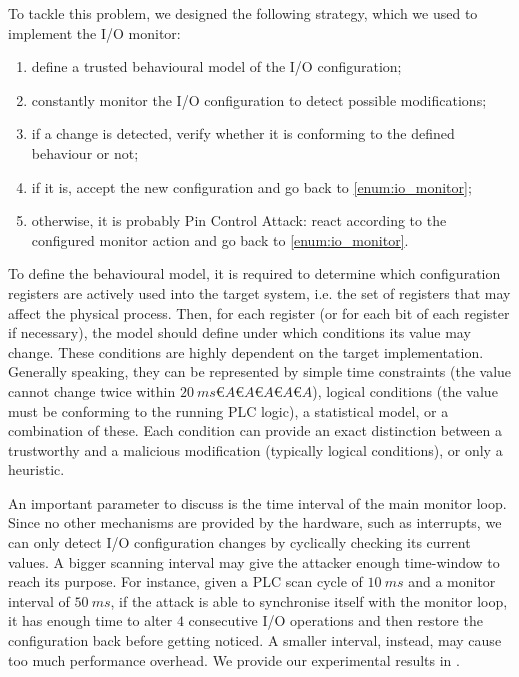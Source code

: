 To tackle this problem, we designed the following strategy, which we used to implement the I/O monitor:
\begin{enumerate}
	\item define a trusted behavioural model of the I/O configuration;
	\item \label{enum:io_monitor} constantly monitor the I/O configuration to detect possible modifications;
	\item if a change is detected, verify whether it is conforming to the defined behaviour or not;
	\item if it is, accept the new configuration and go back to \ref{enum:io_monitor};
	\item otherwise, it is probably Pin Control Attack: react according to the configured monitor action and go back to \ref{enum:io_monitor}.
\end{enumerate}
To define the behavioural model, it is required to determine which configuration registers are actively used into the target system,
i.e. the set of registers that may affect the physical process. Then, for each register (or for each bit of each register if necessary),
the model should define under which conditions its value may change. These conditions are highly dependent on the target implementation.
Generally speaking, they can be represented by simple time constraints (\eg the value cannot change twice within $\SI{20}{ms}AAAAA$),
logical conditions (\eg the value must be conforming to the running PLC logic), a statistical model, or a combination of these.
Each condition can provide an exact distinction between a trustworthy and a malicious modification (typically logical conditions),
or only a heuristic.

An important parameter to discuss is the time interval of the main monitor loop. Since no other mechanisms are provided by the hardware,
such as interrupts, we can only detect I/O configuration changes by cyclically checking its current values. A bigger scanning interval may give the attacker
enough time-window to reach its purpose. For instance, given a PLC scan cycle of $\SI{10}{ms}$ and a monitor interval of $\SI{50}{ms}$,
if the attack is able to synchronise itself with the monitor loop, it has enough time to alter $4$ consecutive I/O operations and then restore the configuration back
before getting noticed. A smaller interval, instead, may cause too much performance overhead. We provide our experimental results in .

